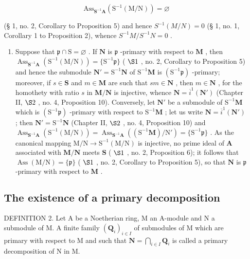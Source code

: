 \[
\mathrm{Ass} _ {\mathbf {S} ^ {- 1} \mathbf {A}} (\mathrm{S} ^ {- 1} (\mathrm{M} / \mathrm{N})) = \varnothing
\]

(§ 1, no. 2, Corollary to Proposition 5) and hence \(S^{-1}(M/N) = 0\) (§ 1, no. 1, Corollary 1 to Proposition 2), whence \(S^{-1}M/S^{-1}N = 0\) .

\begin{enumerate}
\def\labelenumi{(\roman{enumi})}
\setcounter{enumi}{1}
\tightlist
\item
  Suppose that \(\mathfrak{p} \cap \mathrm{S} = \varnothing\) . If \(\mathbf{N}\) is \(\mathfrak{p}\) -primary with respect to \(\mathbf{M}\) , then \(\operatorname{Ass}_{\mathbf{S}^{-1}\mathbf{A}}(\mathrm{S}^{-1}(\mathrm{M/N})) = \{\mathrm{S}^{-1}\mathfrak{p}\}\) ( \(\S 1\) , no. 2, Corollary to Proposition 5) and hence the submodule \(\mathbf{N}' = \mathrm{S}^{-1}\mathbf{N}\) of \(\mathrm{S}^{-1}\mathbf{M}\) is \((\mathrm{S}^{-1}\mathfrak{p})\) -primary; moreover, if \(s \in \mathbf{S}\) and \(m \in \mathbf{M}\) are such that \(sm \in \mathbf{N}\) , then \(m \in \mathbf{N}\) , for the homothety with ratio \(s\) in \(\mathbf{M/N}\) is injective, whence \(\mathbf{N} = \overline{i}^{1}(\mathbf{N}')\) (Chapter II, \(\S 2\) , no. 4, Proposition 10). Conversely, let \(\mathbf{N}'\) be a submodule of \(\mathrm{S}^{-1}\mathbf{M}\) which is \((\mathrm{S}^{-1}\mathfrak{p})\) -primary with respect to \(\mathrm{S}^{-1}\mathbf{M}\) ; let us write \(\mathbf{N} = \overline{i}^{1}(\mathbf{N}')\) ; then \(\mathbf{N}' = \mathrm{S}^{-1}\mathbf{N}\) (Chapter II, \(\S 2\) , no. 4, Proposition 10) and \(\operatorname{Ass}_{\mathbf{S}^{-1}\mathbf{A}}(\mathrm{S}^{-1}(\mathrm{M/N})) = \operatorname{Ass}_{\mathbf{S}^{-1}\mathbf{A}}((\mathrm{S}^{-1}\mathbf{M})/\mathrm{N}') = \{\mathrm{S}^{-1}\mathfrak{p}\}\) . As the canonical mapping \(\mathrm{M/N} \to \mathrm{S}^{-1}(\mathrm{M/N})\) is injective, no prime ideal of \(\mathbf{A}\) associated with \(\mathbf{M/N}\) meets \(\mathbf{S}\) ( \(\S 1\) , no. 2, Proposition 6); it follows that \(\operatorname{Ass}(\mathrm{M/N}) = \{\mathfrak{p}\}\) ( \(\S 1\) , no. 2, Corollary to Proposition 5), so that \(\mathbf{N}\) is \(\mathfrak{p}\) -primary with respect to \(\mathbf{M}\) .
\end{enumerate}

\subsection{The existence of a primary decomposition}

DEFINITION 2. Let A be a Noetherian ring, M an A-module and N a submodule of M. A finite family \((\mathbf{Q}_i)_{i\in I}\) of submodules of M which are primary with respect to M and such that \(\mathbf{N} = \bigcap_{i\in I}\mathbf{Q}_i\) is called a primary decomposition of N in M.

